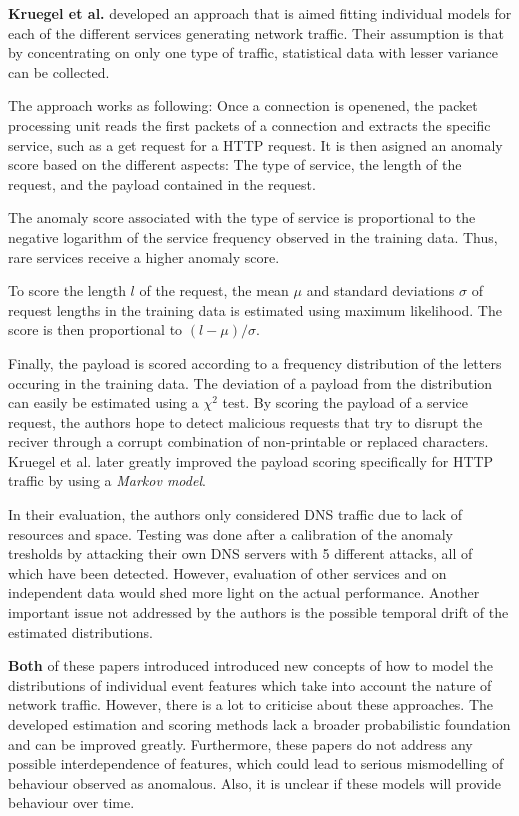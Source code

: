 \documentclass[a4paper,12pt,twoside]{report}
\begin{document}
\textbf{Kruegel et al.} \cite{krugel2002service} developed an approach that is aimed fitting individual models for each of the different services generating network traffic. Their assumption is that by concentrating on only one type of traffic, statistical data with lesser variance can be collected. 

The approach works as following: Once a connection is openened, the packet processing unit reads the first packets of a connection and extracts the specific service, such as a get request for a HTTP request. It is then asigned an anomaly score based on the different aspects: The type of service, the length of the request, and the payload contained in the request. 

The anomaly score associated with the type of service is proportional to the negative logarithm of the service frequency observed in the training data. Thus, rare services receive a higher anomaly score. 

To score the length $l$ of the request, the mean $\mu$ and standard deviations $\sigma$ of request lengths in the training data is estimated using maximum likelihood. The score is then proportional to $(l-\mu)/\sigma$.

Finally, the payload is scored according to a frequency distribution of the letters occuring in the training data. The deviation of a payload from the distribution can easily be estimated using a $\chi^2$ test. By scoring the payload of a service request, the authors hope to detect malicious requests that try to disrupt the reciver through a corrupt combination of non-printable or replaced characters. Kruegel et al. \cite{kruegel2005multi} later greatly improved the payload scoring specifically for HTTP traffic by using a \textit{Markov model}.


In their evaluation, the authors only considered DNS traffic due to lack of resources and space. Testing was done after a calibration of the anomaly tresholds by attacking their own DNS servers with 5 different attacks, all of which have been detected. However, evaluation of other services and on independent data would shed more light on the actual performance. Another important issue not addressed by the authors is the possible temporal drift of the estimated distributions.



\textbf{Both} of these papers introduced introduced new concepts of how to model the distributions of individual event features which take into account the nature of network traffic. However, there is a lot to criticise about these approaches. The developed estimation and scoring methods lack a broader probabilistic foundation and can be improved greatly. Furthermore, these papers do not address any possible interdependence of features, which could lead to serious mismodelling of behaviour observed as anomalous. Also, it is unclear if these models will provide behaviour over time.
\end{document}
